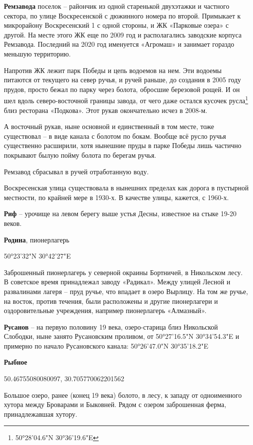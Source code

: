 \medskip

\textbf{Ремзавода} поселок – райончик из одной старенькой двухэтажки и частного сектора, по улице Воскресенской с дюжинного номера по второй. Примыкает к микрорайону Воскресенский 1 с одной стороны, и ЖК «Парковые озера» с другой. На месте этого ЖК еще по 2009 год и располагались заводские корпуса Ремзавода. Последний на 2020 год именуется «Агромаш» и занимает гораздо меньшую территорию.

Напротив ЖК лежит парк Победы и цепь водоемов на нем. Эти водоемы питаются от текущего на север ручья, и ручей раньше, до создания в 2005 году прудов, просто бежал по парку через болота, обросшие березовой рощей. И он шел вдоль северо-восточной границы завода, от чего даже остался кусочек русла\footnote{50°28'04.6"N 30°36'19.6"E} близ ресторана «Подкова». Этот рукав окончательно исчез в 2008-м. 

А восточный рукав, ныне основной и единственный в том месте, тоже существовал – в виде канала с болотом по бокам. Вообще всё русло ручья существенно расширили, хотя нынешние пруды в парке Победы лишь частично покрывают былую пойму болота по берегам ручья.

Ремзавод сбрасывал в ручей отработанную воду.

Воскресенская улица существовала в нынешних пределах как дорога в пустырной местности, по крайней мере в 1930-х. В качестве улицы, кажется,  с 1960-х.\\

\medskip

\textbf{Риф} – урочище на левом берегу выше устья Десны, известное на стыке 19-20 веков.\\

\medskip

\textbf{Родина}, пионерлагерь

50°23'32"N 30°42'27"E

Заброшенный пионерлагерь у северной окраины Бортничей, в Никольском лесу. В советское время принадлежал заводу «Радикал». Между улицей Лесной и развалинами лагеря – пруд ручье, что впадает в озеро Вырлицу. На том же ручье, на восток, против течения, были расположены и другие пионерлагери и оздоровительные учреждения, например пионерлагерь «Алмазный».\\

\medskip


\textbf{Русанов} – на первую половину 19 века, озеро-старица близ Никольской Слободки, ныне занято Русановским проливом, от 50°27'16.5"N 30°34'54.3"E и примерно по начало Русановского канала: 50°26'47.0"N 30°35'18.2"E\\

\medskip

\textbf{Рыбное} 

50.46755080080097, 30.705770062201562

Большое озеро, ранее (конец 19 века) болото, в лесу, к западу от одноименного хутора между Броварами и Быковней. Рядом с озером заброшенная ферма, принадлежавшая хутору.
